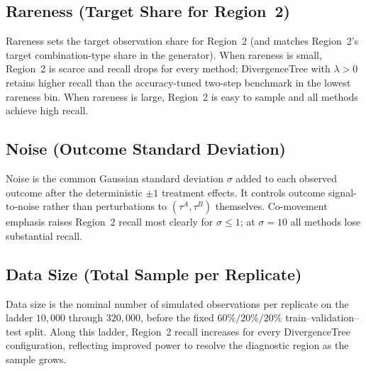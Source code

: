 \documentclass[11pt,letterpaper,english]{article}
\theoremstyle{definition}
\theoremstyle{definition}
\begin{document}
\begin{bibunit}
\begin{appendices}
\subsection{Rareness (Target Share for Region~2)}
Rareness sets the target observation share for Region~2 (and matches Region~2's target combination-type share in the generator). When rareness is small, Region~2 is scarce and recall drops for every method; DivergenceTree with $\lambda>0$ retains higher recall than the accuracy-tuned two-step benchmark in the lowest rareness bin. When rareness is large, Region~2 is easy to sample and all methods achieve high recall.


\subsection{Noise (Outcome Standard Deviation)}
Noise is the common Gaussian standard deviation $\sigma$ added to each observed outcome after the deterministic $\pm 1$ treatment effects. It controls outcome signal-to-noise rather than perturbations to $(\tau^A,\tau^B)$ themselves. Co-movement emphasis raises Region~2 recall most clearly for $\sigma \le 1$; at $\sigma=10$ all methods lose substantial recall.


\subsection{Data Size (Total Sample per Replicate)}
Data size is the nominal number of simulated observations per replicate on the ladder $10{,}000$ through $320{,}000$, before the fixed $60\%/20\%/20\%$ train--validation--test split. Along this ladder, Region~2 recall increases for every DivergenceTree configuration, reflecting improved power to resolve the diagnostic region as the sample grows.



\end{appendices}
\end{bibunit}
\end{document}
